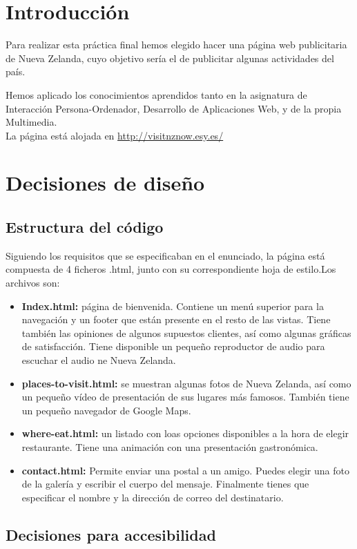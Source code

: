 \section{Introducción}
Para realizar esta práctica final hemos elegido hacer una página web publicitaria de Nueva Zelanda, cuyo objetivo sería el de publicitar algunas actividades del país.

Hemos aplicado los conocimientos aprendidos tanto en la asignatura de Interacción Persona-Ordenador, Desarrollo de Aplicaciones Web, y de la propia Multimedia.\\

La página está alojada en \href{http://visitnznow.esy.es/}{http://visitnznow.esy.es/}
\section{Decisiones de diseño}
\subsection{Estructura del código}
Siguiendo los requisitos que se especificaban en el enunciado, la página está compuesta de 4 ficheros .html, junto con su correspondiente hoja de estilo.Los archivos son:
\begin{itemize}
	\item \textbf{Index.html: }página de bienvenida. Contiene un menú superior para la navegación y un footer que están presente en el resto de las vistas. Tiene también las opiniones de algunos supuestos clientes, así como algunas gráficas de satisfacción. Tiene disponible un pequeño reproductor de audio para escuchar el audio ne Nueva Zelanda. 
	\item \textbf{places-to-visit.html: } se muestran algunas fotos de Nueva Zelanda, así como un pequeño vídeo de presentación de sus lugares más famosos. También tiene un pequeño navegador de Google Maps.
	\item \textbf{where-eat.html: }un listado con loas opciones disponibles a la hora de elegir restaurante. Tiene una animación con una presentación gastronómica.
	\item \textbf{contact.html: }Permite enviar una postal a un amigo. Puedes elegir una foto de la galería y escribir el cuerpo del mensaje. Finalmente tienes que especificar el nombre y la dirección de correo del destinatario.
\end{itemize}

\subsection{Decisiones para accesibilidad}


